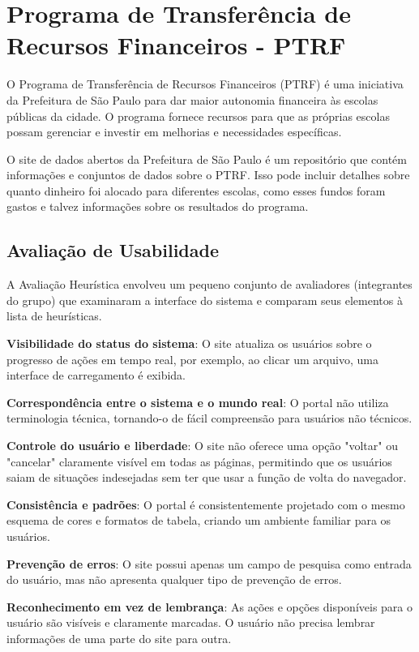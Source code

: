 \section{Programa de Transferência de Recursos Financeiros - PTRF}

O Programa de Transferência de Recursos Financeiros (PTRF) \cite{SP} é uma iniciativa da Prefeitura de São Paulo para dar maior autonomia financeira às escolas públicas da cidade. O programa fornece recursos para que as próprias escolas possam gerenciar e investir em melhorias e necessidades específicas.

O site de dados abertos da Prefeitura de São Paulo é um repositório que contém informações e conjuntos de dados sobre o PTRF. Isso pode incluir detalhes sobre quanto dinheiro foi alocado para diferentes escolas, como esses fundos foram gastos e talvez informações sobre os resultados do programa.

\subsection{Avaliação de Usabilidade}

A Avaliação Heurística envolveu um pequeno conjunto de avaliadores (integrantes do grupo) que examinaram a interface do sistema e comparam seus elementos à lista de heurísticas.

\textbf{Visibilidade do status do sistema}: O site atualiza os usuários sobre o progresso de ações em tempo real, por exemplo, ao clicar um arquivo, uma interface de carregamento é exibida.

\textbf{Correspondência entre o sistema e o mundo real}: O portal não utiliza terminologia técnica, tornando-o de fácil compreensão para usuários não técnicos.

\textbf{Controle do usuário e liberdade}: O site não oferece uma opção "voltar" ou "cancelar" claramente visível em todas as páginas, permitindo que os usuários saiam de situações indesejadas sem ter que usar a função de volta do navegador.

\textbf{Consistência e padrões}: O portal é consistentemente projetado com o mesmo esquema de cores e formatos de tabela, criando um ambiente familiar para os usuários.

\textbf{Prevenção de erros}: O site possui apenas um campo de pesquisa como entrada do usuário, mas não apresenta qualquer tipo de prevenção de erros.

\textbf{Reconhecimento em vez de lembrança}: As ações e opções disponíveis para o usuário são visíveis e claramente marcadas. O usuário não precisa lembrar informações de uma parte do site para outra.

